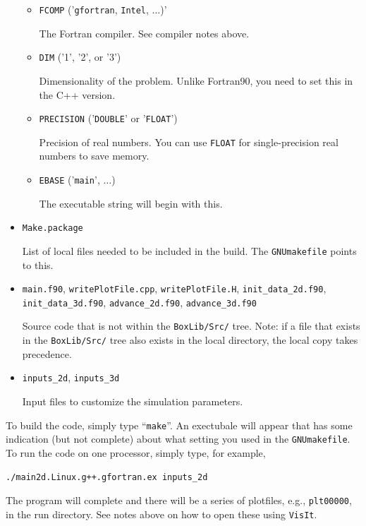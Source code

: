 \begin{itemize}
\begin{itemize}
    \item {\tt FCOMP} ('{\tt gfortran}, {\tt Intel}, $\ldots$)'

    The Fortran compiler.  See compiler notes above.

    \item {\tt DIM} ('1', '2', or '3')

    Dimensionality of the problem.  Unlike Fortran90, you need to set this in the C++ version.

    \item {\tt PRECISION} ('{\tt DOUBLE}' or '{\tt FLOAT}')

    Precision of real numbers.  You can use {\tt FLOAT} for single-precision real numbers to save memory.

    \item {\tt EBASE} ('{\tt main}', $\ldots$)

    The executable string will begin with this.

  \end{itemize}

\item {\tt Make.package}

List of local files needed to be included in the build.  The {\tt GNUmakefile} points to this.

\item {\tt main.f90}, {\tt writePlotFile.cpp}, {\tt writePlotFile.H}, {\tt init\_data\_2d.f90},
      {\tt init\_data\_3d.f90}, {\tt advance\_2d.f90}, {\tt advance\_3d.f90}

Source code that is not within the {\tt BoxLib/Src/} tree.  Note: if a file that exists in the
{\tt BoxLib/Src/} tree also exists in the local directory, the local copy takes precedence.

\item {\tt inputs\_2d}, {\tt inputs\_3d}

Input files to customize the simulation parameters.

\end{itemize}

To build the code, simply type ``{\tt make}''.  An exectubale will appear that has some indication (but not complete)
about what setting you used in the {\tt GNUmakefile}.  To run the code on one processor, simply type, for example,
\begin{lstlisting}[backgroundcolor=\color{light-red}]
./main2d.Linux.g++.gfortran.ex inputs_2d
\end{lstlisting}
The program will complete and there will be a series of plotfiles, e.g., {\tt plt00000}, in the run directory.  See notes above on how to open these using {\tt VisIt}.

